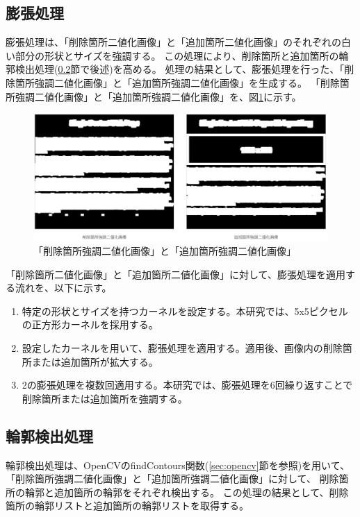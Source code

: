 \subsection{膨張処理}\label{subsec:dilation}
膨張処理は、「削除箇所二値化画像」と「追加箇所二値化画像」のそれぞれの白い部分の形状とサイズを強調する。
この処理により、削除箇所と追加箇所の輪郭検出処理(\ref{subsec:contour_detection_processing}節で後述)を高める。
処理の結果として、膨張処理を行った、「削除箇所強調二値化画像」と「追加箇所強調二値化画像」を生成する。
「削除箇所強調二値化画像」と「追加箇所強調二値化画像」を、図\ref{fig: img_del_add_highlight_bin}に示す。
\begin{figure}[tp]
    \begin{center}
        \includegraphics[width=1.0\columnwidth]{image/4_img_del_add_highlight_bin.png}
        \caption{「削除箇所強調二値化画像」と「追加箇所強調二値化画像」}
        \label{fig: img_del_add_highlight_bin}
    \end{center}
\end{figure}
\par
「削除箇所二値化画像」と「追加箇所二値化画像」に対して、膨張処理を適用する流れを、以下に示す。
\begin{enumerate}
    \item 特定の形状とサイズを持つカーネルを設定する。本研究では、5x5ピクセルの正方形カーネルを採用する。
    \item 設定したカーネルを用いて、膨張処理を適用する。適用後、画像内の削除箇所または追加箇所が拡大する。
    \item 2の膨張処理を複数回適用する。本研究では、膨張処理を6回繰り返すことで削除箇所または追加箇所を強調する。
\end{enumerate}

\subsection{輪郭検出処理}\label{subsec:contour_detection_processing}
輪郭検出処理は、OpenCVのfindContours関数(\ref{sec:opencv}節を参照)を用いて、「削除箇所強調二値化画像」と「追加箇所強調二値化画像」に対して、
削除箇所の輪郭と追加箇所の輪郭をそれぞれ検出する。
この処理の結果として、削除箇所の輪郭リストと追加箇所の輪郭リストを取得する。

